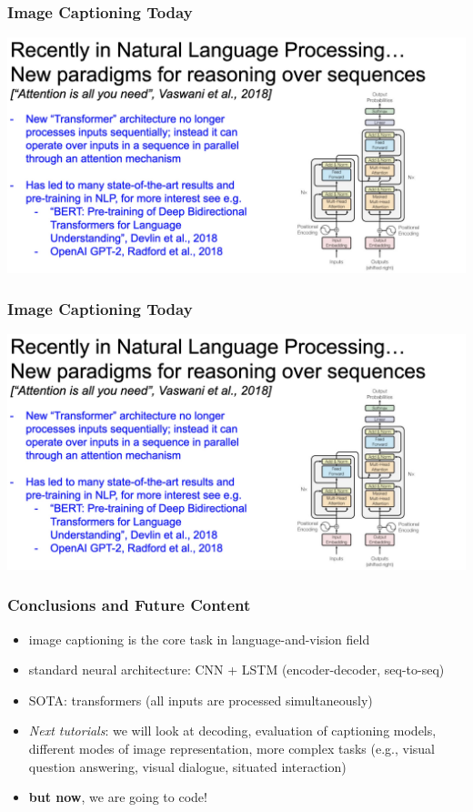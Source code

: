 \documentclass[aspectratio=1610]{beamer} %
\begin{document}
\begin{frame}
\frametitle{Image Captioning Today}
\begin{center}
\includegraphics[width=.95\textwidth]{pics/imp3}
\end{center}
\end{frame}

\begin{frame}
\frametitle{Image Captioning Today}
\begin{center}
\includegraphics[width=.95\textwidth]{pics/imp3}
\end{center}
\end{frame}

\begin{frame}
\frametitle{Conclusions and Future Content}
\begin{itemize}
	\item image captioning is the core task in language-and-vision field
	\pause
	\item standard neural architecture: CNN + LSTM (encoder-decoder, seq-to-seq)
	\pause
	\item SOTA: transformers (all inputs are processed simultaneously)
	\pause
	\item \textit{Next tutorials}: we will look at decoding, evaluation of captioning models, different modes of image representation, more complex tasks (e.g., visual question answering, visual dialogue, situated interaction)
	\pause
	\item \textbf{but now}, we are going to code!
\end{itemize}
\end{frame}
\end{document}
